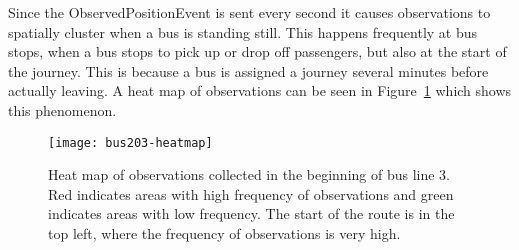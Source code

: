 \begin{table}
  \centering
  \caption{Summary of the event types used in the thesis project.}\label{tbl:event-sent}
\end{table}

Since the ObservedPositionEvent is sent every second it causes
observations to spatially cluster when a bus is standing still. This
happens frequently at bus stops, when a bus stops to pick up or drop
off passengers, but also at the start of the journey. This is because
a bus is assigned a journey several minutes before actually
leaving. A heat map of observations can be seen in
Figure~\ref{fig:bus203-heatmap} which shows this phenomenon.

\begin{figure}
  \centering
  \texttt{[image: bus203-heatmap]}
  \caption{Heat map of observations collected in the beginning of bus line 3. 
    Red indicates areas with high frequency of observations and green indicates areas with
    low frequency. The start of the route is in the top left, where
    the frequency of observations is very high. }\label{fig:bus203-heatmap}
\end{figure}


